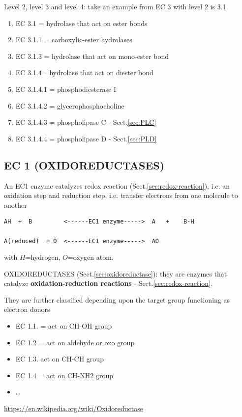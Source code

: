 Level 2, level 3 and level 4: take an example from EC 3 with level 2 is 3.1 
\begin{enumerate}
  \item EC 3.1 = hydrolase that act on ester bonds
  \item EC 3.1.1 = carboxylic-ester hydrolases
  \item EC 3.1.3 =  hydrolase that act on mono-ester bond
  \item EC 3.1.4= hydrolase that act on diester bond
  \item EC 3.1.4.1 = phosphodiesterase I
  \item EC 3.1.4.2 = glycerophosphocholine
  \item EC 3.1.4.3 = phospholipase C - Sect.\ref{sec:PLC}
  \item EC 3.1.4.4 = phospholipase D - Sect.\ref{sec:PLD}
\end{enumerate}

\subsection{EC 1 (OXIDOREDUCTASES)}
\label{sec:EC_1}

An EC1 enzyme catalyzes redox reaction (Sect.\ref{sec:redox-reaction}), i.e. an
oxidation step and reduction step, i.e. transfer electrons from one molecule to
another
\begin{verbatim}
AH  +  B         <------EC1 enzyme----->  A   +    B-H

A(reduced)  + O  <------EC1 enzyme----->  AO
\end{verbatim}
with $H$=hydrogen, $O$=oxygen atom.

OXIDOREDUCTASES (Sect.\ref{sec:oxidoreductase}): they are enzymes that catalyze
{\bf oxidation-reduction reactions} - Sect.\ref{sec:redox-reaction}.

They are further classified depending upon the target group functioning as
electron donors
\begin{itemize}
  \item EC 1.1. = act on CH-OH group
  
  \item EC 1.2 = act on aldehyde or oxo group
  
  \item EC 1.3. act on CH-CH group
  
  \item EC 1.4 = act on CH-NH2 group
  
  \item \ldots
\end{itemize}
\url{https://en.wikipedia.org/wiki/Oxidoreductase}

